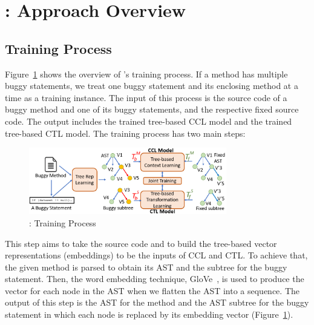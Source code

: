 \section{{\tool}: Approach Overview}
\label{overview:sec}



\subsection{Training Process}

Figure~\ref{overview-training} shows the overview of {\tool}'s
training process. If a method has multiple buggy statements, we treat
one buggy statement and its enclosing method at a time as a training
instance. The input of this process is the source code of a buggy
method and one of its buggy statements, and the respective fixed
source code.  The output includes the trained tree-based CCL model and
the trained tree-based CTL model.
%
The training process has two main steps:

\begin{figure}[t]
	\centering
	\includegraphics[width=3.4in]{graphs/new_overview.png}
        \vspace{-15pt}
	\caption{{\tool}: Training Process}
	\label{overview-training}
\end{figure}

 This step aims to
take the source code and to build the tree-based vector
representations (embeddings) to be the inputs of CCL and CTL. To
achieve that, the given method is parsed to obtain its AST
and the subtree for the buggy statement.
Then, the word embedding technique, GloVe~\cite{pennington2014glove},
is used to produce the vector for each node in the AST when we flatten
the AST into a sequence. The output of this step is the AST for the
method and the AST subtree for the buggy statement
in which each node is replaced by its embedding vector
(Figure~\ref{overview-training}).

